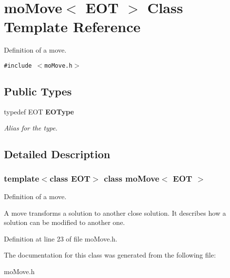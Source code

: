 \section{moMove$<$ EOT $>$ Class Template Reference}
\label{classmo_move}
Definition of a move.  


{\tt \#include $<$moMove.h$>$}

\subsection*{Public Types}
\begin{CompactItemize}
\item 
typedef EOT {\bf EOType}\label{classmo_move_7fb853a91ba1319530529e515380bbba}

\begin{CompactList}\small\item\em Alias for the type. \item\end{CompactList}\end{CompactItemize}


\subsection{Detailed Description}
\subsubsection*{template$<$class EOT$>$ class moMove$<$ EOT $>$}

Definition of a move. 

A move transforms a solution to another close solution. It describes how a solution can be modified to another one. 



Definition at line 23 of file moMove.h.

The documentation for this class was generated from the following file:\begin{CompactItemize}
\item 
moMove.h\end{CompactItemize}

